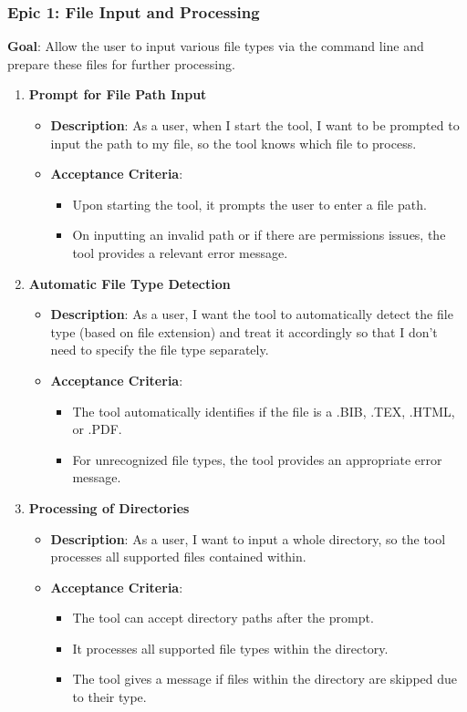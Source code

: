 \subsubsection{Epic 1: File Input and Processing}
\textbf{Goal}: Allow the user to input various file types via the command line and prepare these files for further processing.
\begin{enumerate}
    \item \textbf{Prompt for File Path Input}
    \begin{itemize}
        \item \textbf{Description}: As a user, when I start the tool, I want to be prompted to input the path to my file, so the tool knows which file to process.
        \item \textbf{Acceptance Criteria}:
        \begin{itemize}
            \item Upon starting the tool, it prompts the user to enter a file path.
            \item On inputting an invalid path or if there are permissions issues, the tool provides a relevant error message.
        \end{itemize}
    \end{itemize}

    \item \textbf{Automatic File Type Detection}
    \begin{itemize}
        \item \textbf{Description}: As a user, I want the tool to automatically detect the file type (based on file extension) and treat it accordingly so that I don't need to specify the file type separately.
        \item \textbf{Acceptance Criteria}:
        \begin{itemize}
            \item The tool automatically identifies if the file is a .BIB, .TEX, .HTML, or .PDF.
            \item For unrecognized file types, the tool provides an appropriate error message.
        \end{itemize}
    \end{itemize}

    \item \textbf{Processing of Directories}
    \begin{itemize}
        \item \textbf{Description}: As a user, I want to input a whole directory, so the tool processes all supported files contained within.
        \item \textbf{Acceptance Criteria}:
        \begin{itemize}
            \item The tool can accept directory paths after the prompt.
            \item It processes all supported file types within the directory.
            \item The tool gives a message if files within the directory are skipped due to their type.
        \end{itemize}
    \end{itemize}


\end{enumerate}
